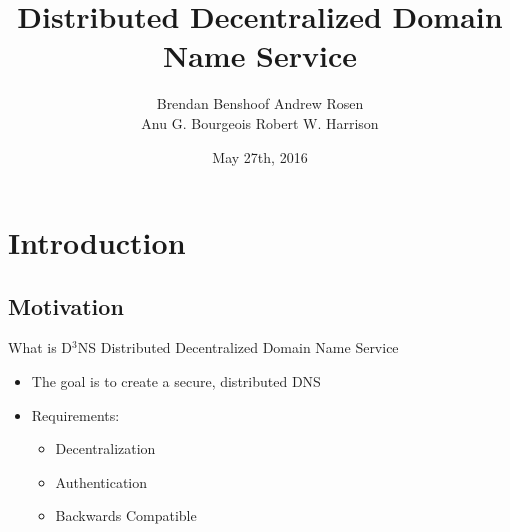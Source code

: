 \documentclass[11pt]{beamer}
\title[D$^3$NS]{Distributed Decentralized Domain Name Service}
\author{
Brendan Benshoof \qquad Andrew Rosen \\ \qquad Anu G. Bourgeois \qquad Robert W. Harrison }
\institute{Georgia State University}
\date{May 27th, 2016}
\begin{document}
	
\maketitle

\section{Introduction}
\subsection{Motivation}

\begin{frame}{What is D$^3$NS}
Distributed Decentralized Domain Name Service

\begin{itemize}
	\item The goal is to create a secure, distributed DNS 
	\item Requirements:
	\begin{itemize}
		\item Decentralization
		\item Authentication
		\item Backwards Compatible
	\end{itemize}
\end{itemize}

\end{frame}


\end{document}
